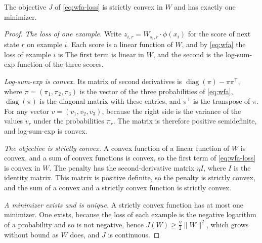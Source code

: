 \begin{proposition}
\label{prop:convex}%
The objective $J$ of \cref{eq:wfa-loss} is strictly convex in $W$ and has
exactly one minimizer.
\end{proposition}

\begin{proof}
\emph{The loss of one example.} Write $z_{i,r} = W_{s_i,r} \cdot \phi(x_i)$
for the score of next state $r$ on example $i$. Each score is a linear
function of $W$, and by \cref{eq:wfa} the loss of example $i$ is
The first term is linear in $W$, and the second is the log-sum-exp function
of the three scores.

\emph{Log-sum-exp is convex.} Its matrix of second derivatives is
$\operatorname{diag}(\pi) - \pi \pi^{\mathsf T}$, where
$\pi = (\pi_1, \pi_2, \pi_3)$ is the vector of the three probabilities of
\cref{eq:wfa}, $\operatorname{diag}(\pi)$ is the diagonal matrix with these
entries, and $\pi^{\mathsf T}$ is the transpose of $\pi$. For any vector
$v = (v_1, v_2, v_3)$,
because the right side is the variance of the values $v_r$ under the
probabilities $\pi_r$. The matrix is therefore positive semidefinite, and
log-sum-exp is convex.

\emph{The objective is strictly convex.} A convex function of a linear
function of $W$ is convex, and a sum of convex functions is convex, so the
first term of \cref{eq:wfa-loss} is convex in $W$. The penalty has the
second-derivative matrix $\eta I$, where $I$ is the identity matrix. This
matrix is positive definite, so the penalty is strictly convex, and the sum
 of a convex and a strictly convex function is strictly convex.

\emph{A minimizer exists and is unique.} A strictly convex function has at
most one minimizer. One exists, because the loss of each example is the
negative logarithm of a probability and so is not negative, hence
$J(W) \ge \tfrac{\eta}{2} \lVert W \rVert^2$, which grows without bound as $W$
does, and $J$ is continuous.
\end{proof}

